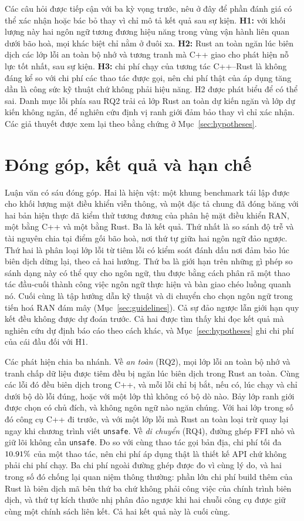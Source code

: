Các câu hỏi được tiếp cận với ba kỳ vọng trước, nêu ở đây để phần đánh giá có thể xác nhận
hoặc bác bỏ thay vì chỉ mô tả kết quả sau sự kiện. \textbf{H1:} với khối lượng này hai ngôn
ngữ tương đương hiệu năng trong vùng vận hành liên quan dưới bão hoà, mọi khác biệt chỉ nằm
ở đuôi xa. \textbf{H2:} Rust an toàn ngăn lúc biên dịch các lớp lỗi an toàn bộ nhớ và tương
tranh mà C++ giao cho phát hiện nỗ lực tốt nhất, sau sự kiện. \textbf{H3:} chi phí chạy của
tương tác C++--Rust là không đáng kể so với chi phí các thao tác được gọi, nên chi phí thật
của áp dụng tăng dần là công sức kỹ thuật chứ không phải hiệu năng. H2 được phát biểu để có
thể sai. Danh mục lỗi phía sau RQ2 trải cả lớp Rust an toàn dự kiến ngăn và lớp dự kiến không
ngăn, để nghiên cứu định vị ranh giới đảm bảo thay vì chỉ xác nhận. Các giả thuyết được xem
lại theo bằng chứng ở Mục~\ref{sec:hypotheses}.

\section{Đóng góp, kết quả và hạn chế}
Luận văn có sáu đóng góp. Hai là hiện vật: một khung benchmark tái lập được cho khối lượng
mặt điều khiển viễn thông, và một đặc tả chung đã đóng băng với hai bản hiện thực đã kiểm thử
tương đương của phân hệ mặt điều khiển RAN, một bằng C++ và một bằng Rust. Ba là kết quả.
Thứ nhất là so sánh độ trễ và tài nguyên chia tại điểm gối bão hoà, nơi thứ tự giữa hai ngôn
ngữ đảo ngược. Thứ hai là phân loại lớp lỗi từ tiêm lỗi có kiểm soát đánh dấu nơi đảm bảo lúc
biên dịch dừng lại, theo cả hai hướng. Thứ ba là giới hạn trên những gì phép so sánh dạng này
có thể quy cho ngôn ngữ, thu được bằng cách phân rã một thao tác đầu-cuối thành công việc
ngôn ngữ thực hiện và bàn giao chéo luồng quanh nó. Cuối cùng là tập hướng dẫn kỹ thuật và di
chuyển cho chọn ngôn ngữ trong tiến hoá RAN đám mây (Mục~\ref{sec:guidelines}). Cả sự đảo
ngược lẫn giới hạn quy kết đều không được dự đoán trước. Cả hai được tìm thấy khi đọc kết quả
mà nghiên cứu dự định báo cáo theo cách khác, và Mục~\ref{sec:hypotheses} ghi chi phí của cái
đầu đối với H1.

Các phát hiện chia ba nhánh. Về \emph{an toàn} (RQ2), mọi lớp lỗi an toàn bộ nhớ và tranh chấp
dữ liệu được tiêm đều bị ngăn lúc biên dịch trong Rust an toàn. Cùng các lỗi đó đều biên dịch
trong C++, và mỗi lỗi chỉ bị bắt, nếu có, lúc chạy và chỉ dưới bộ dò lỗi đúng, hoặc với một
lớp thì không có bộ dò nào. Bảy lớp ranh giới được chọn có chủ đích, và không ngôn ngữ nào
ngăn chúng. Với hai lớp trong số đó công cụ C++ đi trước, và với một lớp lỗi mà Rust an toàn
loại trừ quay lại ngay khi chương trình viết \texttt{unsafe}. Về \emph{di chuyển} (RQ4), đường
ghép FFI nhỏ và giữ lõi không cần \texttt{unsafe}. Đo so với cùng thao tác gọi bản địa, chi
phí tối đa $10.91\%$ của một thao tác, nên chi phí áp dụng thật là thiết kế API chứ
không phải chi phí chạy. Ba chi phí ngoài đường ghép được đo vì cùng lý do, và hai trong số
đó chống lại quan niệm thông thường: phần lớn chi phí build thêm của Rust là biên dịch mã bên
thứ ba chứ không phải công việc của chính trình biên dịch, và thứ tự kích thước nhị phân đảo
ngược khi hai chuỗi công cụ được giữ cùng một chính sách liên kết. Cả hai kết quả này là cuối
cùng.

